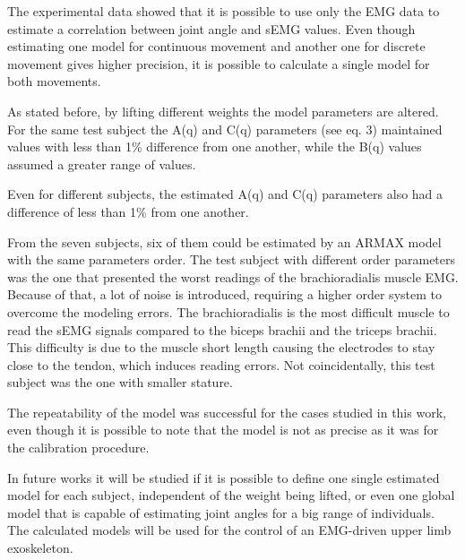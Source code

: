 The experimental data showed that it is possible to use only the EMG data to estimate a correlation between joint angle and sEMG values. Even though estimating one model for continuous movement and another one for discrete movement gives higher precision, it is possible to calculate a single model for both movements.

As stated before, by lifting different weights the model parameters are altered.
For the same test subject the A(q) and C(q) parameters (see eq. 3) maintained values with less than 1\% difference from one another, while the B(q) values assumed a greater range of values.

Even for different subjects, the estimated A(q) and C(q) parameters also had a difference of less than 1\% from one another.

From the seven subjects, six of them could be estimated by an ARMAX model with the same parameters order. The test subject with different order parameters was the one that presented the worst readings of the brachioradialis muscle EMG. Because of that, a lot of noise is introduced, requiring a higher order system to overcome the modeling errors. The brachioradialis is the most difficult muscle to read the sEMG signals compared to the biceps brachii and the triceps brachii. This difficulty is due to the muscle short length causing the electrodes to stay close to the tendon, which induces  reading errors. Not coincidentally, this test subject was the one with smaller stature.

The repeatability of the model was successful for the cases studied in this work, even though it is possible to note that the model is not as precise as it was for the calibration procedure.

In future works it will be studied if it is possible to define one single estimated model for each subject, independent of the weight being lifted, or even one global model that is capable of estimating joint angles for a big range of individuals. The calculated models will be used for the control of an EMG-driven upper limb exoskeleton.